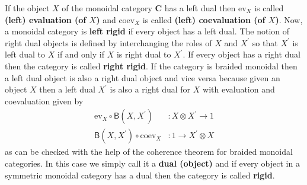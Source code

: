 If the object $X$ of the monoidal category $\mathbf{C}$ has a left dual then $\mathrm{ev}_{X}$ is called \textbf{(left) evaluation (of $X$)} and $\mathrm{coev}_{X}$ is called \textbf{(left) coevaluation (of $X$)}. Now, a monoidal category is \textbf{left rigid} if every object has a left dual. The notion of right dual objects is defined by interchanging the roles of $X$ and $X^{\prime}$ so that $X^{\prime}$ is left dual to $X$ if and only if $X$ is right dual to $X^{\prime}$. If every object has a right dual then the category is called \textbf{right rigid}. If the category is braided monoidal then a left dual object is also a right dual object and vice versa because given an object $X$ then a left dual $X^{\prime}$ is also a right dual for $X$ with evaluation and coevaluation given by
\begin{align*}
  \mathrm{ev}_{X}
  \circ
  \mathsf{B}(X,X^{\prime})
  &\colon
  X
  \otimes
  X^{\prime}
  \to
  1
  \\
  \mathsf{B}(X,X^{\prime})
  \circ
  \mathrm{coev}_{X}
  &\colon
  1
  \to
  X^{\prime}
  \otimes
  X
\end{align*}
as can be checked with the help of the coherence theorem for braided monoidal categories. In this case we simply call it a \textbf{dual (object)} and if every object in a symmetric monoidal category has a dual then the category is called \textbf{rigid}.

